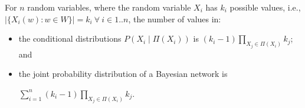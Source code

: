 For $n$ random variables, where the random variable $X_i$ has $k_i$ possible
values, i.e., $|\{ X_i(w) : w \in W \}| = k_i \ \forall\ i \in 1 .. n$, the
number of values in:
\begin{itemize}
  \item the conditional distributions $P(X_i \mid \Pi(X_i))$ is
        $(k_i - 1) \prod_{X_j \in \Pi(X_i)} k_j$; and
  \item the joint probability distribution of a Bayesian network is

        $\sum_{i = 1}^{n} (k_i - 1) \prod_{X_j \in \Pi(X_i)} k_j$.
\end{itemize}